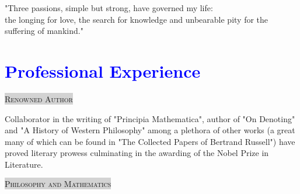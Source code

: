 \documentclass[a4paper, oneside, final]{scrartcl}
\begin{document}
\begin{center}
 
\begin{flushleft}
    \textcolor{orange}{\textsc{\Huge{}}}
\end{flushleft}

    \begin{flushleft}

	\colorbox{liteblue} {
		\parbox {\columnwidth }{
			"Three passions, simple but strong, have governed my life: \\
			the longing for love, the search for knowledge and unbearable pity for the suffering of mankind."
		}
	}

    \end{flushleft}

\section{\textcolor{blue}{Professional Experience}} 

    \begin{flushleft}
        \parbox{\textwidth} {
            \colorbox{LightGrey} {
                \textsc{\small{Renowned Author}}
            }
        } 
    \end{flushleft}

    \begin{flushleft}
        \hspace{2em}
		Collaborator in the writing of "Principia Mathematica", author of "On Denoting" and "A History of Western Philosophy" among a plethora of other works (a great many of which can be found in "The Collected Papers of Bertrand Russell") have proved literary prowess culminating in the awarding of the Nobel Prize in Literature.
    \end{flushleft}

	\parbox{\textwidth} {
	    \colorbox{LightGrey} {
		\textsc{\small{Philosophy and Mathematics}}
	    }
	} 

    \begin{center}


\end{center}
\end{center}
\end{document}

